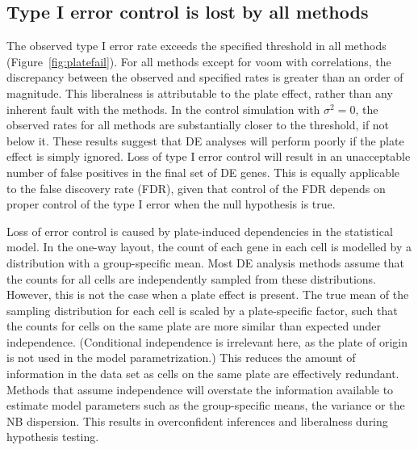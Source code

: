 \documentclass[oupdraft]{bio}
\begin{document}

\subsection{Type I error control is lost by all methods}
The observed type I error rate exceeds the specified threshold in all methods (Figure~\ref{fig:platefail}).
For all methods except for voom with correlations, the discrepancy between the observed and specified rates is greater than an order of magnitude.
This liberalness is attributable to the plate effect, rather than any inherent fault with the methods.
In the control simulation with $\sigma^2=0$, the observed rates for all methods are substantially closer to the threshold, if not below it.
These results suggest that DE analyses will perform poorly if the plate effect is simply ignored.
Loss of type I error control will result in an unacceptable number of false positives in the final set of DE genes.
This is equally applicable to the false discovery rate (FDR), given that control of the FDR depends on proper control of the type I error when the null hypothesis is true.

Loss of error control is caused by plate-induced dependencies in the statistical model.
In the one-way layout, the count of each gene in each cell is modelled by a distribution with a group-specific mean.
Most DE analysis methods assume that the counts for all cells are independently sampled from these distributions.
However, this is not the case when a plate effect is present.
The true mean of the sampling distribution for each cell is scaled by a plate-specific factor, 
    such that the counts for cells on the same plate are more similar than expected under independence.
(Conditional independence is irrelevant here, as the plate of origin is not used in the model parametrization.)
This reduces the amount of information in the data set as cells on the same plate are effectively redundant.
Methods that assume independence will overstate the information available to estimate model parameters such as the group-specific means, the variance or the NB dispersion.
This results in overconfident inferences and liberalness during hypothesis testing.
\end{document}
